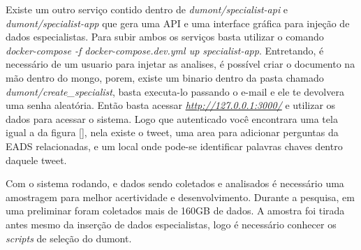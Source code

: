 Existe um outro serviço contido dentro de \textit{dumont/specialist-api} e \textit{dumont/specialist-app} que gera uma API e uma interface gráfica para injeção de dados especialistas. Para subir ambos os serviços basta utilizar o comando \textit{docker-compose -f docker-compose.dev.yml up specialist-app}. Entretando, é necessário de um usuario para injetar as analises, é possível criar o documento na mão dentro do mongo, porem, existe um binario dentro da pasta chamado \textit{dumont/create\_specialist}, basta executa-lo passando o e-mail e ele te devolvera uma senha aleatória. Então basta acessar \textit{\url{http://127.0.0.1:3000/}} e utilizar os dados para acessar o sistema. Logo que autenticado você encontrara uma tela igual a da figura \ref{}, nela existe o tweet, uma area para adicionar perguntas da EADS relacionadas, e um local onde pode-se identificar palavras chaves dentro daquele tweet.

Com o sistema rodando, e dados sendo coletados e analisados é necessário uma amostragem para melhor acertividade e desenvolvimento. Durante a pesquisa, em uma preliminar foram coletados mais de 160GB de dados. A amostra foi tirada antes mesmo da inserção de dados especialistas, logo é necessário conhecer os \textit{scripts} de seleção do dumont.
